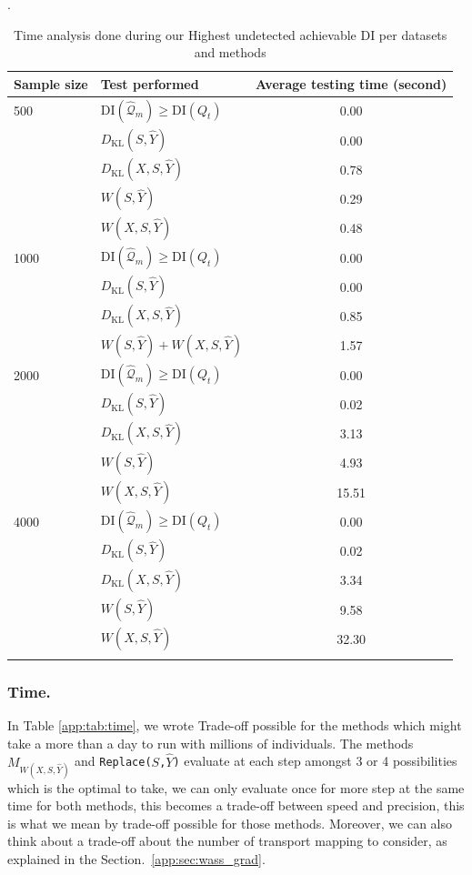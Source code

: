 \documentclass[runningheads, orivec]{llncs}
\newcommand{\KL}{D_{\mathrm{KL}}}
\begin{document}
\begin{table}[tb!]
  
  \centering
  \caption{Time analysis done during our Highest undetected achievable DI per datasets and methods}.
  \label{app:tab:test_time}
\begin{tabular}{llc}
\toprule
Sample size & Test performed & Average testing time (second)\\
\midrule
500 & $\text{DI}(\widehat{\mathcal{Q}}_m) \geq \text{DI}(Q_t) $ & 0.00 \\
& $\KL(S,\widehat{Y})$   & 0.00 \\
& $\KL(X,S,\widehat{Y})$ & 0.78 \\
& $W(S,\widehat{Y})$    & 0.29 \\ %
& $W(X,S,\widehat{Y})$  & 0.48 \\
\midrule
1000 & $\text{DI}(\widehat{\mathcal{Q}}_m) \geq \text{DI}(Q_t) $ & 0.00 \\
& $\KL(S,\widehat{Y})$   & 0.00 \\
& $\KL(X,S,\widehat{Y})$ & 0.85 \\
& $W(S,\widehat{Y}) + W(X,S,\widehat{Y})$ & 1.57 \\
\midrule
2000 & $\text{DI}(\widehat{\mathcal{Q}}_m) \geq \text{DI}(Q_t) $ & 0.00 \\
& $\KL(S,\widehat{Y})$   & 0.02 \\
& $\KL(X,S,\widehat{Y})$ & 3.13 \\
& $W(S,\widehat{Y})$    & 4.93 \\
& $W(X,S,\widehat{Y})$  & 15.51 \\
\midrule
4000 & $\text{DI}(\widehat{\mathcal{Q}}_m) \geq \text{DI}(Q_t) $ & 0.00 \\
& $\KL(S,\widehat{Y})$   & 0.02 \\
& $\KL(X,S,\widehat{Y})$ & 3.34 \\
& $W(S,\widehat{Y})$    & 9.58 \\
& $W(X,S,\widehat{Y})$  & 32.30 \\
\bottomrule
\vspace{-0.7cm}
\end{tabular}

\end{table}

\subsubsection{Time.} In Table \ref{app:tab:time}, we wrote Trade-off possible for the methods which might take a more than a day to run with millions of individuals. The methods $M_{W(X,S,\widehat{Y})}$ and \texttt{Replace($S$,$\widehat{Y}$)} evaluate at each step amongst 3 or 4 possibilities which is the optimal to take, we can only evaluate once for more step at the same time for both methods, this becomes a trade-off between speed and precision, this is what we mean by trade-off possible for those methods. Moreover, we can also think about a trade-off about the number of transport mapping to consider, as explained in the Section.~\ref{app:sec:wass_grad}. 
\end{document}
